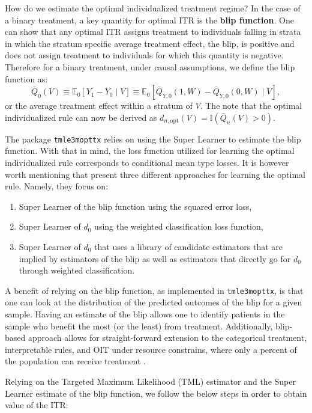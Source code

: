 \documentclass[
  12pt, krantz2,
]{krantz}
\newcommand{\passthrough}[1]{#1}
\newcommand{\E}{\mathbb{E}}
\newcommand{\1}{\mathbbm{1}}
\theoremstyle{definition}
\theoremstyle{definition}
\theoremstyle{definition}
\theoremstyle{definition}
\theoremstyle{remark}
\begin{document}
How do we estimate the optimal individualized treatment regime? In the case of a
binary treatment, a key quantity for optimal ITR is the \textbf{blip function}. One can
show that any optimal ITR assigns treatment to individuals falling in strata in
which the stratum specific average treatment effect, the blip, is
positive and does not assign treatment to individuals for which this quantity is
negative. Therefore for a binary treatment, under causal assumptions, we define
the blip function as:
\[\bar{Q}_0(V) \equiv \E_0[Y_1-Y_0 \mid V] \equiv \E_0[\bar{Q}_{Y,0}(1,W) -
\bar{Q}_{Y,0}(0,W) \mid V],\]
or the average treatment effect within a stratum of \(V\). The note that the
optimal individualized rule can now be derived as \(d_{n,\text{opt}}(V) = \mathbb{I}(\bar{Q}_{n}(V) > 0)\).

The package \passthrough{\lstinline!tmle3mopttx!} relies on using the Super Learner to estimate the blip
function. With that in mind, the loss function utilized for learning the optimal
individualized rule corresponds to conditional mean type losses. It is however worth
mentioning that \citet{luedtke2016super} present three different approaches for learning the optimal
rule. Namely, they focus on:

\begin{enumerate}
\def\labelenumi{\arabic{enumi}.}
\item
  Super Learner of the blip function using the squared error loss,
\item
  Super Learner of \(d_0\) using the weighted classification loss function,
\item
  Super Learner of \(d_0\) that uses a library of candidate estimators that are
  implied by estimators of the blip as well as estimators that directly go for
  \(d_0\) through weighted classification.
\end{enumerate}

A benefit of relying on the blip function, as implemented in \passthrough{\lstinline!tmle3mopttx!}, is that
one can look at the distribution of the predicted outcomes of the blip for a given
sample. Having an estimate of the blip allows one to identify patients in the sample
who benefit the most (or the least) from treatment. Additionally, blip-based approach
allows for straight-forward extension to the categorical treatment, interpretable rules,
and OIT under resource constrains, where only a percent of the population can receive
treatment \citep{luedtke2016resource}.

Relying on the Targeted Maximum Likelihood (TML) estimator and the Super Learner
estimate of the blip function, we follow the below steps in order to obtain
value of the ITR:
\end{document}
